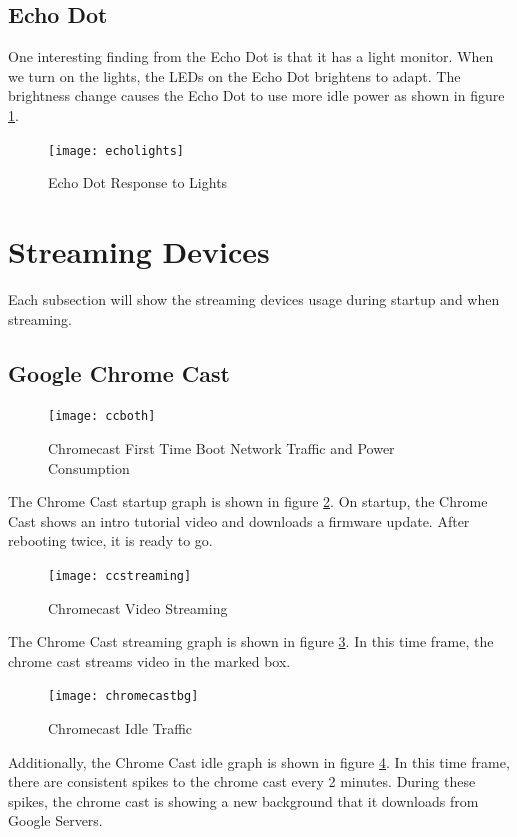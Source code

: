 \subsection{Echo Dot}

One interesting finding from the Echo Dot is that it has a light monitor. When we turn on the lights, the LEDs on the Echo Dot brightens to adapt. The brightness change causes the Echo Dot to use more idle power as shown in figure \ref{fig:echolights}.

\begin{figure}[H]
  \centering
    \texttt{[image: echolights]}
  \caption{Echo Dot Response to Lights}
  \label{fig:echolights}
\end{figure}

\section{Streaming Devices}
\label{Streaming Devices}

Each subsection will show the streaming devices usage during startup and when streaming.

\subsection{Google Chrome Cast}
\begin{figure}[H]
  \centering
  \texttt{[image: ccboth]}
  \caption{Chromecast First Time Boot Network Traffic and Power Consumption}
  \label{fig:ccboth}
\end{figure}

The Chrome Cast startup graph is shown in figure \ref{fig:ccboth}. On startup, the Chrome Cast shows an intro tutorial video and downloads a firmware update. After rebooting twice, it is ready to go.

\begin{figure}[H]
  \centering
  \texttt{[image: ccstreaming]}
  \caption{Chromecast Video Streaming}
  \label{fig:ccstream}
\end{figure}

The Chrome Cast streaming graph is shown in figure \ref{fig:ccstream}. In this time frame, the chrome cast streams video in the marked box.

\begin{figure}[H]
  \centering
  \texttt{[image: chromecastbg]}
  \caption{Chromecast Idle Traffic}
  \label{fig:ccbg}
\end{figure}

Additionally, the Chrome Cast idle graph is shown in figure \ref{fig:ccbg}. In this time frame, there are consistent spikes to the chrome cast every 2 minutes. During these spikes, the chrome cast is showing a new background that it downloads from Google Servers.

